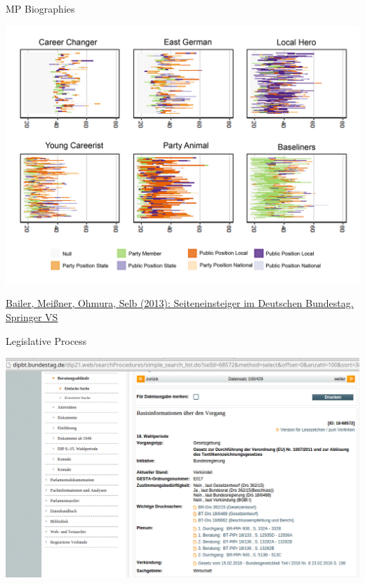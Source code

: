 \documentclass[ignorenonframetext,]{beamer}
\begin{document}
\begin{frame}{MP Biographies}

\includegraphics{fig/politicalcareers2.png}

\href{http://www.springer.com/us/book/9783658010256}{Bailer, Meißner,
Ohmura, Selb (2013): Seiteneinsteiger im Deutschen Bundestag. Springer
VS}

\end{frame}

\begin{frame}{Legislative Process}

\includegraphics{fig/legislation0.png}

\end{frame}
\end{document}
